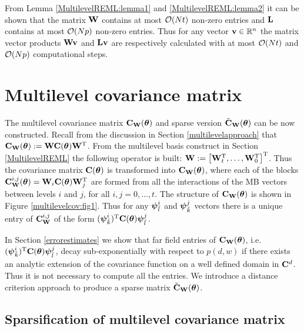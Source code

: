 \documentclass[11pt,final]{amsart}       %
\begin{document}
From Lemma \ref{MultilevelREML:lemma1} and \ref{MultilevelREML:lemma2}
it can be shown that the matrix $\mathbf{W}$ contains at most ${\mathcal O}(Nt)$
non-zero entries and $\mathbf{L}$ contains at most ${\mathcal O}(Np)$ non-zero
entries. Thus for any vector $\mathbf{v} \in \Bbb{R}^{n}$ the matrix vector
products $\mathbf{W} \mathbf{v}$ and $\mathbf{L} \mathbf{v}$ are respectively calculated with at
most ${\mathcal O}(Nt)$ and ${\mathcal O}(Np)$ computational steps.


\section{Multilevel covariance matrix}
\label{MultilevelCovarianceMatrix}

The multilevel covariance matrix $\mathbf{C}_{\mathbf{W}}(\boldsymbol{\theta})$ and sparse
version $\tilde {\mathbf{C}}_{\mathbf{W}}(\boldsymbol{\theta})$ can be now constructed.  Recall from
the discussion in Section \ref{multilevelapproach} that
$\mathbf{C}_{\mathbf{W}}(\boldsymbol{\theta}):=\mathbf{W} \mathbf{C}(\boldsymbol{\theta}) \mathbf{W} ^{\rm T}$. From the multilevel
basis construct in Section \ref{MultilevelREML} the following
operator is built: $\mathbf{W} := \left[ \mathbf{W}_t^{\rm T}, \dots, \mathbf{W}_0^{\rm T}
  \right] ^{\rm T}$. Thus the covariance matrix $\mathbf{C}(\boldsymbol{\theta})$ is
transformed into $\mathbf{C}_{\mathbf{W}}(\boldsymbol{\theta})$, where each of the blocks
$\mathbf{C}^{i,j}_{\mathbf{W}}(\boldsymbol{\theta}) = \mathbf{W}_i \mathbf{C}(\boldsymbol{\theta}) \mathbf{W}_j ^{\rm T}$ are formed from
all the interactions of the MB vectors between levels $i$ and $j$, for
all $i,j = 0, \dots, t$. The structure of $\mathbf{C}_{\mathbf{W}}(\boldsymbol{\theta})$ is shown
in Figure \ref{multilevelcov:fig1}.  Thus for any
$\boldsymbol{\psi}^{i}_{\tilde{l}}$ and $\boldsymbol{\psi}^{j}_{\tilde{k}}$ vectors there is a
unique entry of $\mathbf{C}^{i,j}_{\mathbf{W}}$ of the form
$(\boldsymbol{\psi}^{i}_{\tilde{k}})^{\rm T} \mathbf{C}(\boldsymbol{\theta}) \boldsymbol{\psi}^{j}_{\tilde{l}}$.



In Section \ref{errorestimates} we show that far field entries of
$\mathbf{C}_{\mathbf{W}}(\boldsymbol{\theta})$, i.e. $(\boldsymbol{\psi}^{i}_{\tilde{k}})^{\rm T} \mathbf{C}(\boldsymbol{\theta})
\boldsymbol{\psi}^{j}_{\tilde{l}}$, decay sub-exponentially with respect to
$p(d,w)$ if there exists an analytic extension of the covariance
function on a well defined domain in $\mathbf{C}^{d}$. Thus it is not
necessary to compute all the entries. We introduce a distance
criterion approach to produce a sparse matrix $\tilde
{\mathbf{C}}_{\mathbf{W}}(\boldsymbol{\theta})$.

\subsection{Sparsification of multilevel covariance matrix}
\end{document}
